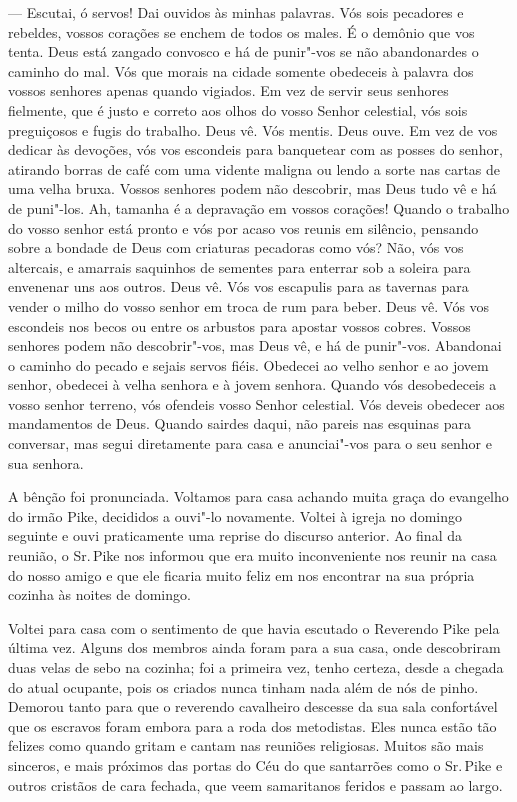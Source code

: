 --- Escutai, ó servos! Dai ouvidos às minhas palavras. Vós sois
pecadores e rebeldes, vossos corações se enchem de todos os males. É o
demônio que vos tenta. Deus está zangado convosco e há de punir"-vos se
não abandonardes o caminho do mal. Vós que morais na cidade somente
obedeceis à palavra dos vossos senhores apenas quando vigiados. Em vez
de servir seus senhores fielmente, que é justo e correto aos olhos do
vosso Senhor celestial, vós sois preguiçosos e fugis do trabalho. Deus
vê. Vós mentis. Deus ouve. Em vez de vos dedicar às devoções, vós vos
escondeis para banquetear com as posses do senhor, atirando borras de
café com uma vidente maligna ou lendo a sorte nas cartas de uma velha
bruxa. Vossos senhores podem não descobrir, mas Deus tudo vê e há de
puni"-los. Ah, tamanha é a depravação em vossos corações! Quando o
trabalho do vosso senhor está pronto e vós por acaso vos reunis em
silêncio, pensando sobre a bondade de Deus com criaturas pecadoras como
vós? Não, vós vos altercais, e amarrais saquinhos de sementes para
enterrar sob a soleira para envenenar uns aos outros. Deus vê. Vós vos
escapulis para as tavernas para vender o milho do vosso senhor em troca
de rum para beber. Deus vê. Vós vos escondeis nos becos ou entre os
arbustos para apostar vossos cobres. Vossos senhores podem não
descobrir"-vos, mas Deus vê, e há de punir"-vos. Abandonai o caminho do
pecado e sejais servos fiéis. Obedecei ao velho senhor e ao jovem
senhor, obedecei à velha senhora e à jovem senhora. Quando vós
desobedeceis a vosso senhor terreno, vós ofendeis vosso Senhor
celestial. Vós deveis obedecer aos mandamentos de Deus. Quando sairdes
daqui, não pareis nas esquinas para conversar, mas segui diretamente
para casa e anunciai"-vos para o seu senhor e sua senhora.

A bênção foi pronunciada. Voltamos para
casa achando muita graça do evangelho do irmão Pike, decididos a ouvi"-lo
novamente. Voltei à igreja no domingo seguinte e ouvi praticamente uma
reprise do discurso anterior. Ao final da reunião, o Sr.\,Pike nos
informou que era muito inconveniente nos reunir na casa do nosso amigo e
que ele ficaria muito feliz em nos encontrar na sua própria cozinha às
noites de domingo.

Voltei para casa com o sentimento de
que havia escutado o Reverendo Pike pela última vez. Alguns dos membros
ainda foram para a sua casa, onde descobriram duas velas de sebo na
cozinha; foi a primeira vez, tenho certeza, desde a chegada do atual
ocupante, pois os criados nunca tinham nada além de nós de pinho.
Demorou tanto para que o reverendo cavalheiro descesse da sua sala
confortável que os escravos foram embora para a roda dos metodistas.
Eles nunca estão tão felizes como quando gritam e cantam nas reuniões
religiosas. Muitos são mais sinceros, e mais próximos das portas do Céu
do que santarrões como o Sr.\,Pike e outros cristãos de cara fechada, que
veem samaritanos feridos e passam ao largo.


